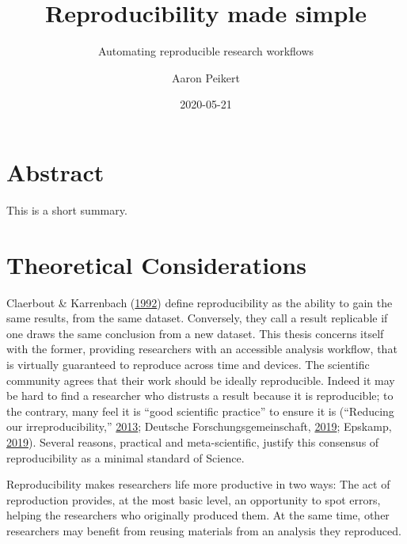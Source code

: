 \documentclass[12pt,a4paper,]{article}
\title{Reproducibility made simple}
\subtitle{Automating reproducible research workflows}
\author{Aaron Peikert}
\date{2020-05-21}
\begin{document}
\maketitle

{
\setcounter{tocdepth}{2}
\tableofcontents
}
\hypertarget{abstract}{%
\section*{Abstract}\label{abstract}}

This is a short summary.

\hypertarget{theoretical-considerations}{%
\section{Theoretical Considerations}\label{theoretical-considerations}}

Claerbout \& Karrenbach (\protect\hyperlink{ref-claerboutElectronicDocumentsGive1992}{1992}) define reproducibility as the ability to gain the same results, from the same dataset.
Conversely, they call a result replicable if one draws the same conclusion from a new dataset.
This thesis concerns itself with the former, providing researchers with an accessible analysis workflow, that is virtually guaranteed to reproduce across time and devices.
The scientific community agrees that their work should be ideally reproducible.
Indeed it may be hard to find a researcher who distrusts a result because it is reproducible; to the contrary, many feel it is ``good scientific practice'' to ensure it is (``Reducing our irreproducibility,'' \protect\hyperlink{ref-AnnouncementReducingOur2013}{2013}; Deutsche Forschungsgemeinschaft, \protect\hyperlink{ref-dfg2019}{2019}; Epskamp, \protect\hyperlink{ref-epskamp2019rep}{2019}).
Several reasons, practical and meta-scientific, justify this consensus of reproducibility as a minimal standard of Science.

Reproducibility makes researchers life more productive in two ways:
The act of reproduction provides, at the most basic level, an opportunity to spot errors, helping the researchers who originally produced them.
At the same time, other researchers may benefit from reusing materials from an analysis they reproduced.
\end{document}

